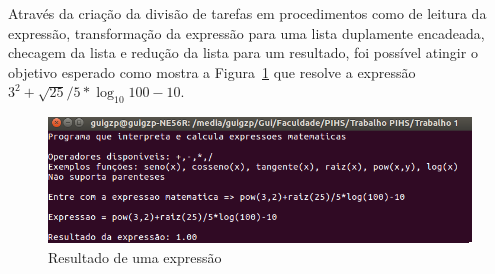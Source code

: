 \documentclass[12pt]{article}
\begin{document}
Através da criação da divisão de tarefas em procedimentos como de leitura da expressão, transformação da expressão para uma lista duplamente encadeada, checagem da lista e redução da lista para um resultado, foi possível atingir o objetivo esperado como mostra a Figura~\ref{fig:resultado} que resolve a expressão ${3^{2} + \sqrt{25}/{5} * {\log_{10} 100} -10 }$.

\begin{figure}[H]
\centering
\includegraphics[width=.5\textwidth]{Imagens/resultado.png}
\caption{Resultado de uma expressão}
\label{fig:resultado}
\end{figure}

\nocite{*}



\end{document}
